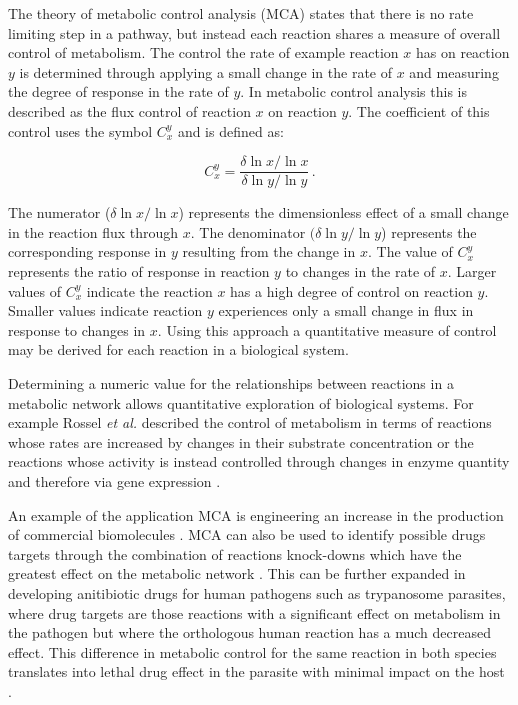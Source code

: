 The theory of metabolic control analysis (MCA) \cite{fell1992,fell1997} states that there is no rate limiting step in a pathway, but instead each reaction shares a measure of overall control of metabolism. The control the rate of example reaction $x$ has on reaction $y$ is determined through applying a small change in the rate of $x$ and measuring the degree of response in the rate of $y$. In metabolic control analysis this is described as the flux control of reaction $x$ on reaction $y$. The coefficient of this control uses the symbol $C_{x}^{y}$ and is defined as:

\begin{equation}\label{fcc}
C_{x}^{y} = \frac{ \delta \ln x / \ln x}{\delta \ln y / \ln y} \, .
\end{equation}

The numerator ($\delta \ln x / \ln x$) represents the dimensionless effect of a small change in the reaction flux through $x$. The denominator $(\delta \ln y / \ln y$) represents the corresponding response in $y$ resulting from the change in $x$. The value of $C_{x}^{y}$ represents the ratio of response in reaction $y$ to changes in the rate of $x$. Larger values of $C_{x}^{y}$ indicate the reaction $x$ has a high degree of control on reaction $y$. Smaller values indicate reaction $y$ experiences only a small change in flux in response to changes in $x$. Using this approach a quantitative measure of control may be derived for each reaction in a biological system.

Determining a numeric value for the relationships between reactions in a metabolic network allows quantitative exploration of biological systems. For example Rossel \emph{et al.} described the control of metabolism in terms of reactions whose rates are increased by changes in their substrate concentration or the reactions whose activity is instead controlled through changes in enzyme quantity and therefore via gene expression \cite{rossell2006,daran-lapujade2007}.

An example of the application MCA is engineering an increase in the production of commercial biomolecules \cite{niederberger1992}. MCA can also be used to identify possible drugs targets through the combination of reactions knock-downs which have the greatest effect on the metabolic network \cite{lehar2008,hopkins2008}. This can be further expanded in developing anitibiotic drugs for human pathogens such as trypanosome parasites, where drug targets are those reactions with a significant effect on metabolism in the pathogen but where the orthologous human reaction has a much decreased effect. This difference in metabolic control for the same reaction in both species translates into lethal drug effect in the parasite with minimal impact on the host \cite{hornberg2007}.

